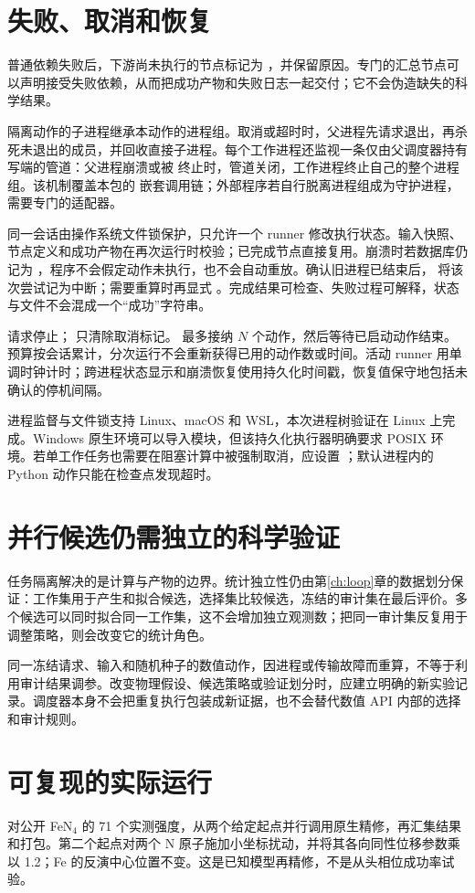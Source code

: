 \section{失败、取消和恢复}
普通依赖失败后，下游尚未执行的节点标记为 ，并保留原因。专门的汇总节点可以声明接受失败依赖，从而把成功产物和失败日志一起交付；它不会伪造缺失的科学结果。

隔离动作的子进程继承本动作的进程组。取消或超时时，父进程先请求退出，再杀死未退出的成员，并回收直接子进程。每个工作进程还监视一条仅由父调度器持有写端的管道：父进程崩溃或被  终止时，管道关闭，工作进程终止自己的整个进程组。该机制覆盖本包的  嵌套调用链；外部程序若自行脱离进程组成为守护进程，需要专门的适配器。

同一会话由操作系统文件锁保护，只允许一个 runner 修改执行状态。输入快照、节点定义和成功产物在再次运行时校验；已完成节点直接复用。崩溃时若数据库仍记为 ，程序不会假定动作未执行，也不会自动重放。确认旧进程已结束后， 将该次尝试记为中断；需要重算时再显式 。完成结果可检查、失败过程可解释，状态与文件不会混成一个“成功”字符串。

 请求停止； 只清除取消标记。 最多接纳 $N$ 个动作，然后等待已启动动作结束。预算按会话累计，分次运行不会重新获得已用的动作数或时间。活动 runner 用单调时钟计时；跨进程状态显示和崩溃恢复使用持久化时间戳，恢复值保守地包括未确认的停机间隔。

进程监督与文件锁支持 Linux、macOS 和 WSL，本次进程树验证在 Linux 上完成。Windows 原生环境可以导入模块，但该持久化执行器明确要求 POSIX 环境。若单工作任务也需要在阻塞计算中被强制取消，应设置 ；默认进程内的 Python 动作只能在检查点发现超时。

\section{并行候选仍需独立的科学验证}
任务隔离解决的是计算与产物的边界。统计独立性仍由第\ref{ch:loop}章的数据划分保证：工作集用于产生和拟合候选，选择集比较候选，冻结的审计集在最后评价。多个候选可以同时拟合同一工作集，这不会增加独立观测数；把同一审计集反复用于调整策略，则会改变它的统计角色。

同一冻结请求、输入和随机种子的数值动作，因进程或传输故障而重算，不等于利用审计结果调参。改变物理假设、候选策略或验证划分时，应建立明确的新实验记录。调度器本身不会把重复执行包装成新证据，也不会替代数值 API 内部的选择和审计规则。

\section{可复现的实际运行}
 对公开 FeN$_4$ 的 71 个实测强度，从两个给定起点并行调用原生精修，再汇集结果和打包\cite{fen4}。第二个起点对两个 N 原子施加小坐标扰动，并将其各向同性位移参数乘以 1.2；Fe 的反演中心位置不变。这是已知模型再精修，不是从头相位成功率试验。

